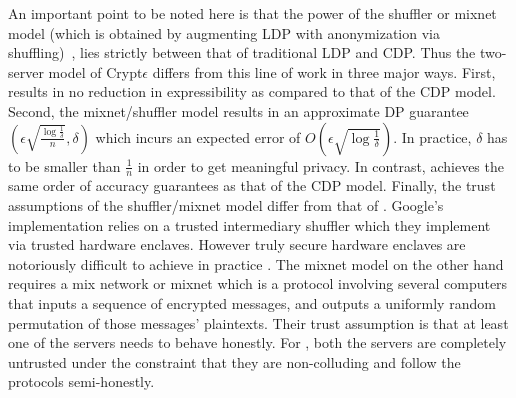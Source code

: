 An important point to be noted here is that the power of the shuffler or mixnet model  (which is obtained by augmenting \textsf{LDP} with anonymization via shuffling)~\cite{Prochlo, mixnets,amplification},  lies strictly between that of traditional \textsf{LDP} and \textsf{CDP}. Thus the two-server model of Crypt$\epsilon$ differs from this line of work in three major ways. First, \system results in no reduction in expressibility as compared to that of the \textsf{CDP} model. Second, the mixnet/shuffler model results in an approximate DP guarantee $(\epsilon\sqrt{\frac{\log\frac{1}{\delta}}{n}},\delta)$ which incurs an expected error of $O(\epsilon\sqrt{\log\frac{1}{\delta}})$.  In practice, $\delta$ has to be smaller than $\frac{1}{n}$ in order to get  meaningful privacy. In contrast, \system achieves the same order of accuracy guarantees as that of the \textsf{CDP} model. Finally, the trust assumptions of the shuffler/mixnet model differ from that of \system. Google's implementation relies on a trusted intermediary shuffler which they implement via trusted hardware enclaves. However truly secure hardware enclaves are notoriously difficult to achieve in practice \cite{Foreshadow}. The mixnet model on the other hand requires a  mix network or mixnet which is a protocol involving several computers that inputs a sequence of encrypted messages, and outputs a uniformly random permutation of those messages' plaintexts.  Their trust assumption is that at least one of the servers needs to behave honestly. For \system, both the servers are completely untrusted under the constraint that they are non-colluding and follow the protocols semi-honestly.
